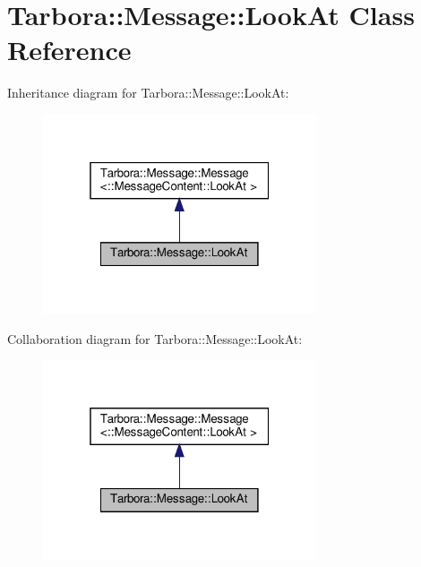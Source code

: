 \hypertarget{classTarbora_1_1Message_1_1LookAt}{}\section{Tarbora\+:\+:Message\+:\+:Look\+At Class Reference}
\label{classTarbora_1_1Message_1_1LookAt}


Inheritance diagram for Tarbora\+:\+:Message\+:\+:Look\+At\+:\nopagebreak
\begin{figure}[H]
\begin{center}
\leavevmode
\includegraphics[width=229pt]{classTarbora_1_1Message_1_1LookAt__inherit__graph}
\end{center}
\end{figure}


Collaboration diagram for Tarbora\+:\+:Message\+:\+:Look\+At\+:\nopagebreak
\begin{figure}[H]
\begin{center}
\leavevmode
\includegraphics[width=229pt]{classTarbora_1_1Message_1_1LookAt__coll__graph}
\end{center}
\end{figure}
